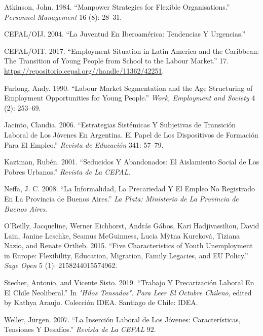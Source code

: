 \documentclass[]{article}
\begin{document}
\leavevmode\hypertarget{ref-atkinson_manpower_1984}{}%
Atkinson, John. 1984. ``Manpower Strategies for Flexible
Organisations.'' \emph{Personnel Management} 16 (8): 28--31.

\leavevmode\hypertarget{ref-cepaloij_juventud_2004}{}%
CEPAL/OIJ. 2004. ``La Juventud En Iberoamérica: Tendencias Y
Urgencias.''

\leavevmode\hypertarget{ref-cepaloit_employment_2017}{}%
CEPAL/OIT. 2017. ``Employment Situation in Latin America and the
Caribbean: The Transition of Young People from School to the Labour
Market.'' 17. \url{https://repositorio.cepal.org//handle/11362/42251}.

\leavevmode\hypertarget{ref-furlong_labour_1990}{}%
Furlong, Andy. 1990. ``Labour Market Segmentation and the Age
Structuring of Employment Opportunities for Young People.'' \emph{Work,
Employment and Society} 4 (2): 253--69.

\leavevmode\hypertarget{ref-jacinto_estrategias_2006}{}%
Jacinto, Claudia. 2006. ``Estrategias Sistémicas Y Subjetivas de
Transición Laboral de Los Jóvenes En Argentina. El Papel de Los
Dispositivos de Formación Para El Empleo.'' \emph{Revista de Educación}
341: 57--79.

\leavevmode\hypertarget{ref-kaztman_seducidos_2001}{}%
Kaztman, Rubén. 2001. ``Seducidos Y Abandonados: El Aislamiento Social
de Los Pobres Urbanos.'' \emph{Revista de La CEPAL}.

\leavevmode\hypertarget{ref-neffa_informalidad_2008}{}%
Neffa, J. C. 2008. ``La Informalidad, La Precariedad Y El Empleo No
Registrado En La Provincia de Buenos Aires.'' \emph{La Plata: Ministerio
de La Provincia de Buenos Aires}.

\leavevmode\hypertarget{ref-oreilly_five_2015}{}%
O'Reilly, Jacqueline, Werner Eichhorst, András Gábos, Kari
Hadjivassiliou, David Lain, Janine Leschke, Seamus McGuinness, Lucia
Mỳtna Kureková, Tiziana Nazio, and Renate Ortlieb. 2015. ``Five
Characteristics of Youth Unemployment in Europe: Flexibility, Education,
Migration, Family Legacies, and EU Policy.'' \emph{Sage Open} 5 (1):
2158244015574962.

\leavevmode\hypertarget{ref-stecher_trabajo_2019}{}%
Stecher, Antonio, and Vicente Sisto. 2019. ``Trabajo Y Precarización
Laboral En El Chile Neoliberal.'' In \emph{"Hilos Tensados". Para Leer
El Octubre Chileno}, edited by Kathya Araujo. Colección IDEA. Santiago
de Chile: IDEA.

\leavevmode\hypertarget{ref-weller_insercion_2007}{}%
Weller, Jürgen. 2007. ``La Inserción Laboral de Los Jóvenes:
Características, Tensiones Y Desafíos.'' \emph{Revista de La CEPAL} 92.
\end{document}
